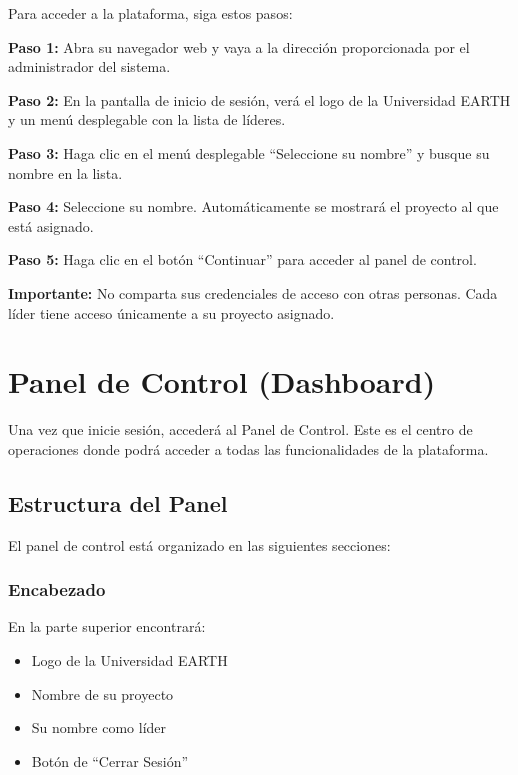 \documentclass[11pt,a4paper]{article}
\begin{document}
Para acceder a la plataforma, siga estos pasos:

\textbf{Paso 1:} Abra su navegador web y vaya a la dirección proporcionada por el administrador del sistema.

\textbf{Paso 2:} En la pantalla de inicio de sesión, verá el logo de la Universidad EARTH y un menú desplegable con la lista de líderes.

\textbf{Paso 3:} Haga clic en el menú desplegable ``Seleccione su nombre'' y busque su nombre en la lista.

\textbf{Paso 4:} Seleccione su nombre. Automáticamente se mostrará el proyecto al que está asignado.

\textbf{Paso 5:} Haga clic en el botón ``Continuar'' para acceder al panel de control.

\begin{warningbox}
\textbf{Importante:} No comparta sus credenciales de acceso con otras personas. Cada líder tiene acceso únicamente a su proyecto asignado.
\end{warningbox}

\section{Panel de Control (Dashboard)}

Una vez que inicie sesión, accederá al Panel de Control. Este es el centro de operaciones donde podrá acceder a todas las funcionalidades de la plataforma.

\subsection{Estructura del Panel}

El panel de control está organizado en las siguientes secciones:

\subsubsection{Encabezado}
En la parte superior encontrará:
\begin{itemize}
  \item Logo de la Universidad EARTH
  \item Nombre de su proyecto
  \item Su nombre como líder
  \item Botón de ``Cerrar Sesión''
\end{itemize}
\end{document}
